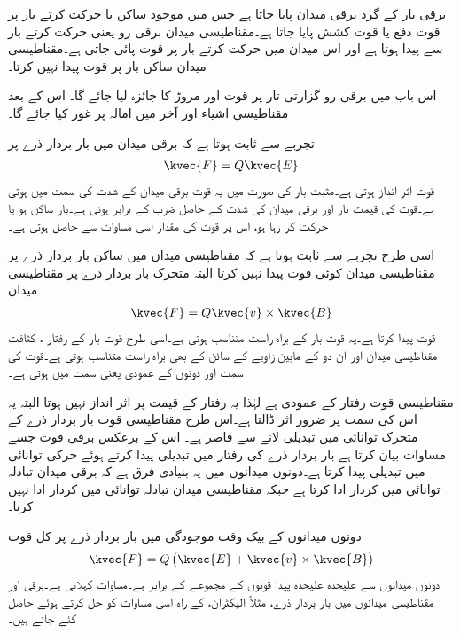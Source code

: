 برقی بار کے گرد برقی میدان پایا جاتا ہے جس میں موجود ساکن یا حرکت کرتے بار پر قوت دفع یا قوت کشش پایا جاتا ہے۔مقناطیسی میدان برقی رو یعنی حرکت کرتے بار سے پیدا ہوتا ہے اور اس میدان میں حرکت کرتے بار پر قوت پائی جاتی ہے۔مقناطیسی میدان ساکن بار پر قوت پیدا نہیں کرتا۔

اس باب میں برقی رو گزارتی تار پر قوت اور مروڑ  کا جائزہ لیا جائے گا۔ اس کے بعد مقناطیسی اشیاء اور آخر میں امالہ پر غور کیا جائے گا۔

تجربے سے  ثابت ہوتا ہے کہ برقی میدان میں بار بردار ذرے  پر 
\begin{align}\label{مساوات_امالہ_برقی_قوت}
\kvec{F}=Q \kvec{E}
\end{align}
قوت اثر انداز ہوتی ہے۔مثبت بار کی صورت میں یہ قوت برقی میدان کے شدت  کی سمت میں ہوتی ہے۔قوت کی قیمت بار  اور برقی میدان کی شدت  کے حاصل ضرب کے برابر ہوتی ہے۔بار ساکن ہو یا حرکت کر رہا ہو، اس پر قوت کی مقدار اسی مساوات سے حاصل ہوتی ہے۔

اسی طرح تجربے سے ثابت ہوتا ہے کہ مقناطیسی میدان میں ساکن بار بردار ذرے  پر مقناطیسی میدان کوئی قوت پیدا نہیں کرتا البتہ متحرک بار بردار ذرے  پر مقناطیسی میدان
\begin{align}\label{مساوات_امالہ_مقناطیسی_قوت}
\kvec{F}=Q \kvec{v} \times \kvec{B} 
\end{align}
قوت پیدا کرتا ہے۔یہ قوت بار  کے براہ راست متناسب ہوتی ہے۔اسی طرح قوت بار کے رفتار ،  کثافت مقناطیسی میدان  اور ان دو کے مابین زاویے کے سائن کے بھی براہ راست متناسب ہوتی ہے۔قوت کی سمت  اور  دونوں کے عمودی یعنی  سمت میں ہوتی ہے۔

مقناطیسی قوت رفتار کے عمودی ہے لہٰذا یہ رفتار کے قیمت پر اثر انداز نہیں ہوتا البتہ یہ اس کی سمت پر ضرور اثر ڈالتا ہے۔اس طرح مقناطیسی قوت بار بردار ذرے کے متحرک توانائی میں تبدیلی لانے سے قاصر ہے۔ اس کے برعکس برقی قوت جسے مساوات  بیان کرتا ہے بار بردار ذرے کی رفتار میں تبدیلی پیدا کرتے ہوئے حرکی توانائی میں تبدیلی پیدا کرتا ہے۔دونوں میدانوں میں یہ بنیادی فرق ہے کہ برقی میدان تبادلہ توانائی میں کردار ادا کرتا ہے جبکہ مقناطیسی میدان تبادلہ توانائی میں کردار ادا نہیں کرتا۔

دونوں میدانوں کے بیک وقت موجودگی میں بار بردار ذرے پر کل قوت
\begin{align}\label{مساوات_امالہ_لورنز}
\kvec{F}=Q\left(\kvec{E}+\kvec{v} \times \kvec{B} \right)
\end{align}
دونوں میدانوں سے علیحدہ علیحدہ پیدا قوتوں کے مجموعے کے برابر ہے۔مساوات   کہلاتی ہے۔برقی اور مقناطیسی میدانوں میں بار بردار ذرے، مثلاً الیکٹران، کے راہ اسی مساوات کو حل کرتے ہوئے حاصل کئے جاتے ہیں۔

